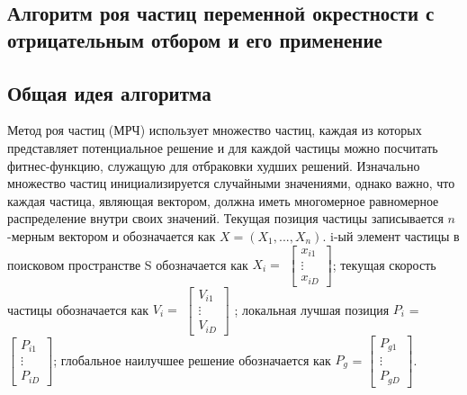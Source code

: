 \parindent=1cm %

\begin{center}
		
		\section{Алгоритм роя частиц  переменной окрестности  с отрицательным отбором и его применение}
		
\end{center}

\subsection{Общая идея алгоритма}

Метод роя частиц (МРЧ) использует множество частиц, каждая из которых представляет потенциальное решение и для каждой частицы можно посчитать фитнес-функцию, служащую для отбраковки худших решений. Изначально множество частиц инициализируется случайными значениями, однако важно, что каждая частица, являющая вектором, должна иметь многомерное равномерное распределение внутри своих значений. Текущая позиция частицы записывается $n$-мерным вектором и обозначается как $X=(X_1,...,X_n)$. i-ый элемент  частицы  в поисковом пространстве S обозначается как $X_i=$ $\begin{bmatrix}
	x_{i1} \\
	
	\vdots \\
	
	x_{iD}
\end{bmatrix}$; текущая скорость частицы обозначается как $V_i=$ 
$\begin{bmatrix}
V_{i1} \\ 

\vdots \\

V_{iD}
\end{bmatrix}$ ; локальная лучшая позиция $P_i$ = $\begin{bmatrix}
P_{i1} 	\\ 

\vdots	\\

P_{iD}
\end{bmatrix}$; глобальное наилучшее решение обозначается как $P_g$ = $\begin{bmatrix}
P_{g1} \\
\vdots \\
P_{gD}	
\end{bmatrix}$. 

